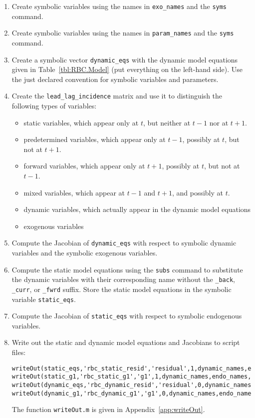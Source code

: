 \begin{enumerate}
\begin{enumerate}
  \item
  Create symbolic variables using the names in \texttt{exo\_names} and the \texttt{syms} command.

  \item
  Create symbolic variables using the names in \texttt{param\_names} and the \texttt{syms} command.

  \item
  Create a symbolic vector \texttt{dynamic\_eqs}
    with the dynamic model equations given in Table~\ref{tbl:RBC.Model}
	(put everything on the left-hand side).
  Use the just declared convention for symbolic variables and parameters.

  \item
  Create the \texttt{lead\_lag\_incidence} matrix and use it to distinguish the following types of variables:
  \begin{itemize}
	\item static variables, which appear only at \(t\), but neither at \(t-1\) nor at \(t+1\).
	\item predetermined variables, which appear only at \(t-1\), possibly at \(t\), but not at \(t+1\).
	\item forward variables, which appear only at \(t+1\), possibly at \(t\), but not at \(t-1\).
	\item mixed variables, which appear at \(t-1\) and \(t+1\), and possibly at \(t\).
	\item dynamic variables, which actually appear in the dynamic model equations
	\item exogenous variables
  \end{itemize}

  \item
  Compute the Jacobian of \texttt{dynamic\_eqs}
    with respect to symbolic dynamic variables and the symbolic exogenous variables.

  \item
  Compute the static model equations using the \texttt{subs} command
    to substitute the dynamic variables with their corresponding name
	without the \texttt{\_back}, \texttt{\_curr}, or \texttt{\_fwrd} suffix.
  Store the static model equations in the symbolic variable \texttt{static\_eqs}.

  \item
  Compute the Jacobian of \texttt{static\_eqs} with respect to symbolic endogenous variables.

  \item
  Write out the static and dynamic model equations and Jacobians to script files:
\begin{lstlisting}[style=Matlab-editor,basicstyle=\mlttfamily\scriptsize]
writeOut(static_eqs,'rbc_static_resid','residual',1,dynamic_names,endo_names,exo_names,param_names);
writeOut(static_g1,'rbc_static_g1','g1',1,dynamic_names,endo_names,exo_names,param_names);
writeOut(dynamic_eqs,'rbc_dynamic_resid','residual',0,dynamic_names,endo_names,exo_names,param_names);
writeOut(dynamic_g1,'rbc_dynamic_g1','g1',0,dynamic_names,endo_names,exo_names,param_names);
\end{lstlisting}
  The function \texttt{writeOut.m} is given in Appendix~\ref{app:writeOut}.


\end{enumerate}
\end{enumerate}
